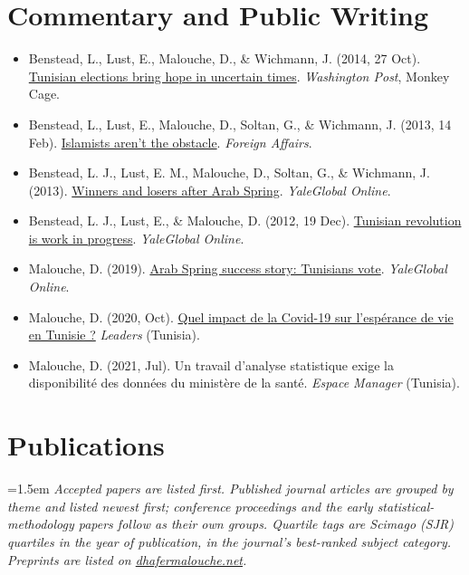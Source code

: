 \documentclass[10pt,a4paper]{article}
\begin{document}
\section{Commentary and Public Writing}
\begin{itemize}
\item Benstead, L., Lust, E., Malouche, D., \& Wichmann, J. (2014, 27 Oct).
      \href{https://www.washingtonpost.com/news/monkey-cage/wp/2014/10/27/tunisian-elections-bring-hope-in-uncertain-times/}{Tunisian elections bring hope in uncertain times}. \emph{Washington Post}, Monkey Cage.
\item Benstead, L., Lust, E., Malouche, D., Soltan, G., \& Wichmann, J. (2013, 14 Feb).
      \href{https://www.foreignaffairs.com/tunisia/islamists-arent-obstacle}{Islamists aren't the obstacle}. \emph{Foreign Affairs}.
\item Benstead, L. J., Lust, E. M., Malouche, D., Soltan, G., \& Wichmann, J. (2013).
      \href{https://archive-yaleglobal.yale.edu/content/winners-and-losers-after-arab-spring}{Winners and losers after Arab Spring}. \emph{YaleGlobal Online}.
\item Benstead, L. J., Lust, E., \& Malouche, D. (2012, 19 Dec).
      \href{https://archive-yaleglobal.yale.edu/content/tunisian-revolution-work-progress}{Tunisian revolution is work in progress}. \emph{YaleGlobal Online}.
\item Malouche, D. (2019). \href{https://archive-yaleglobal.yale.edu/content/arab-spring-success-story-tunisians-vote}{Arab Spring success story: Tunisians vote}. \emph{YaleGlobal Online}.
\item Malouche, D. (2020, Oct). \href{https://leaders.com.tn/article/30775-dhafer-malouche-quel-impact-de-la-covid-19-sur-l-esperance-de-vie-en-tunisie}{Quel impact de la Covid-19 sur l'esp\'erance de vie en Tunisie ?} \emph{Leaders} (Tunisia).
\item Malouche, D. (2021, Jul). Un travail d'analyse statistique exige la disponibilit\'e des donn\'ees du minist\`ere de la sant\'e. \emph{Espace Manager} (Tunisia).
\end{itemize}

\section{Publications}
\emergencystretch=1.5em %
\textit{Accepted papers are listed first. Published journal articles are grouped by theme and listed newest first;
conference proceedings and the early statistical-methodology papers follow as their own groups. Quartile tags are Scimago (SJR) quartiles in the year of publication, in the journal's best-ranked subject category. Preprints are listed on
\href{https://dhafermalouche.net}{dhafermalouche.net}.}%
{\NoHyper\renewcommand{\thefootnote}{}\endNoHyper}
\end{document}
